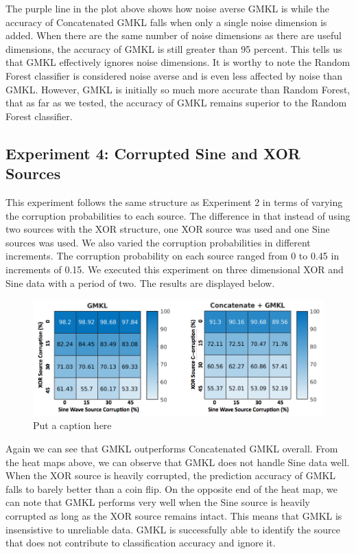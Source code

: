 \documentclass{article}
\begin{document}
The purple line in the plot above shows how noise averse GMKL is while the accuracy of Concatenated GMKL falls when only a single noise dimension is added. When there are the same number of noise dimensions as there are useful dimensions, the accuracy of GMKL is still greater than 95 percent. This tells us that GMKL effectively ignores noise dimensions. It is worthy to note the Random Forest classifier is considered noise averse and is even less affected by noise than GMKL. However, GMKL is initially so much more accurate than Random Forest, that as far as we tested, the accuracy of GMKL remains superior to the Random Forest classifier.



\subsection*{Experiment 4: Corrupted Sine and XOR Sources}

This experiment follows the same structure as Experiment 2 in terms of varying the corruption probabilities to each source. The difference in that instead of using two sources with the XOR structure, one XOR source was used and one Sine sources was used. We also varied the corruption probabilities in different increments. The corruption probability on each source ranged from 0 to 0.45 in increments of 0.15. We executed this experiment on three dimensional XOR and Sine data with a period of two. The results are displayed below.

\begin{figure}
    \centering
    \includegraphics[width=\textwidth]{SineXORCorrupt.png}
    \caption{Put a caption here}
    \label{fig:sinexor_heatmaps}
\end{figure}


Again we can see that GMKL outperforms Concatenated GMKL overall. From the heat maps above, we can observe that GMKL does not handle Sine data well. When the XOR source is heavily corrupted, the prediction accuracy of GMKL falls to barely better than a coin flip. On the opposite end of the heat map, we can note that GMKL performs very well when the Sine source is heavily corrupted as long as the XOR source remains intact. This means that GMKL is insensistive to unreliable data. GMKL is successfully able to identify the source that does not contribute to classification accuracy and ignore it.
\end{document}
